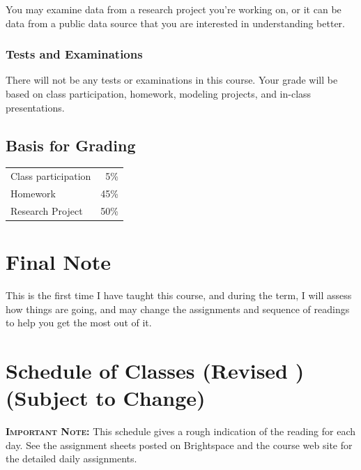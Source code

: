 \documentclass[11pt,twoside]{jgsyllabus}\usepackage[]{graphicx}\usepackage[]{xcolor}
\begin{document}
You may examine data from a research project you're working on, or it
can be data from a public data source that you are interested in
understanding better.

\subsubsection[Tests \& Exams]{Tests and Examinations}

There will not be any tests or examinations in this course. Your grade will be
based on class participation, homework, modeling projects, and in-class
presentations.

\subsection[Grades]{Basis for Grading}

\begin{tabular}{|lr|}
\hline
Class participation &  5\% \\
Homework            & 45\% \\
Research Project    & 50\% \\
\hline
\end{tabular}

\section{Final Note}

This is the first time I have taught this course, and during the term, I will
assess how things are going, and may change the assignments and sequence of
readings to help you get the most out of it.
%
%

%
%
%
%
%
%
%

\cleardoublepage
\clearpage
\appendix
\setcounter{secnumdepth}{0}
\newcommand{\maybehline}{\hline}%
\setlength\extrarowheight{4pt}
\section[Class Schedule]{Schedule of Classes
\ifrevised
	(Revised \RevisionDate)%
\else
	(Subject to Change)%
\fi}

\textbf{\scshape Important Note:} This schedule gives a rough indication of the
reading for each day. See the assignment sheets posted on Brightspace
and the course web site for the detailed daily assignments.
\end{document}
